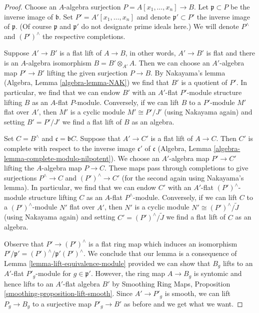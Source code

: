\begin{proof}
Choose an $A$-algebra surjection $P = A[x_1, \ldots, x_n] \to B$.
Let $\mathfrak p \subset P$ be the inverse image of $\mathfrak b$.
Set $P' = A'[x_1, \ldots, x_n]$ and denote $\mathfrak p' \subset P'$
the inverse image of $\mathfrak p$. (Of course $\mathfrak p$
and $\mathfrak p'$ do not designate prime ideals here.)
We will denote $P^\wedge$ and $(P')^\wedge$ the respective completions.

\medskip\noindent
Suppose $A' \to B'$ is a flat lift of $A \to B$, in other words,
$A' \to B'$ is flat and there is an $A$-algebra isomorphism
$B = B' \otimes_{A'} A$. Then we can choose an $A'$-algebra map
$P' \to B'$ lifting the given surjection $P \to B$.
By Nakayama's lemma (Algebra, Lemma \ref{algebra-lemma-NAK})
we find that $B'$ is a quotient of $P'$. In particular, we find
that we can endow $B'$ with an $A'$-flat $P'$-module structure
lifting $B$ as an $A$-flat $P$-module.
Conversely, if we can lift $B$ to a $P'$-module $M'$ flat over $A'$,
then $M'$ is a cyclic module $M' \cong P'/J'$ (using Nakayama again)
and setting $B' = P'/J'$ we find a flat lift of $B$ as an algebra.

\medskip\noindent
Set $C = B^\wedge$ and $\mathfrak c = \mathfrak bC$.
Suppose that $A' \to C'$ is a flat lift of $A \to C$.
Then $C'$ is complete with respect to the inverse image $\mathfrak c'$
of $\mathfrak c$
(Algebra, Lemma \ref{algebra-lemma-complete-modulo-nilpotent}).
We choose an $A'$-algebra map $P' \to C'$ lifting
the $A$-algebra map $P \to C$. These maps pass through
completions to give surjections $P^\wedge \to C$ and $(P')^\wedge \to C'$
(for the second again using Nakayama's lemma).
In particular, we find that we can endow $C'$ with an $A'$-flat
$(P')^\wedge$-module structure lifting $C$ as an $A$-flat $P^\wedge$-module.
Conversely, if we can lift $C$ to a $(P')^\wedge$-module $N'$ flat over $A'$,
then $N'$ is a cyclic module $N' \cong (P')^\wedge/\tilde J$
(using Nakayama again) and setting $C' = (P')^\wedge/\tilde J$
we find a flat lift of $C$ as an algebra.

\medskip\noindent
Observe that $P' \to (P')^\wedge$ is a flat ring map which
induces an isomorphism $P'/\mathfrak p' = (P')^\wedge/\mathfrak p'(P')^\wedge$.
We conclude that our lemma is a consequence of
Lemma \ref{lemma-lift-equivalence-module} provided we can
show that $B_g$ lifts to an $A'$-flat $P'_g$-module for
$g \in \mathfrak p'$. However, the ring map $A \to B_g$ is syntomic
and hence lifts to an $A'$-flat algebra $B'$ by
Smoothing Ring Maps, Proposition \ref{smoothing-proposition-lift-smooth}.
Since $A' \to P'_g$ is smooth, we can lift $P_g \to B_g$
to a surjective map $P'_g \to B'$ as before and we get what we want.
\end{proof}


